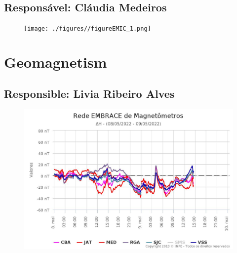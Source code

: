 \documentclass[a4paper, 10pt]{article}
\begin{document}
 \subsection{Responsável: Cláudia Medeiros} 
 
\begin{figure}[H]
    
                        \centering
   
                             \texttt{[image: ./figures//figureEMIC\_1.png]}

                        \end{figure}

                     \section{Geomagnetism} 
 \subsection{Responsible: Livia Ribeiro Alves} 
 
\begin{figure}[H]
    
                        \centering
   
                             \includegraphics[width=14cm]{./figures//figureGeomag_0.png}

                        \end{figure}
\end{document}
